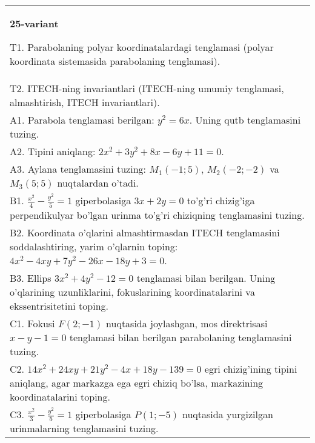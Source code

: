 \documentclass{article}
\begin{document}
\begin{tabular}{m{17cm}}
\textbf{25-variant}
\newline

T1. Parabolaning polyar koordinatalardagi tenglamasi (polyar koordinata sistemasida parabolaning tenglamasi).\\

T2. ITECH-ning invariantlari (ITECH-ning umumiy tenglamasi, almashtirish, ITECH invariantlari).\\

A1. Parabola tenglamasi berilgan: $y^2=6x$. Uning qutb tenglamasini tuzing.\\

A2. Tipini aniqlang: $2x^{2}+3y^{2}+8x-6y+11=0$.\\

A3. Aylana tenglamasini tuzing: $M_1(-1;5)$, $M_2(-2;-2)$ va $M_3(5;5)$ nuqtalardan o'tadi.\\

B1. $\frac{x^{2}}{4} - \frac{y^{2}}{5} = 1$ giperbolasiga $3x + 2y = 0$ to'g'ri chizig'iga perpendikulyar bo'lgan urinma to'g'ri chiziqning tenglamasini tuzing.\\

B2. Koordinata o'qlarini almashtirmasdan ITECH tenglamasini soddalashtiring, yarim o'qlarnin toping: $4x^{2} - 4xy + 7y^{2} - 26x - 18y + 3 = 0$.\\

B3. Ellips $3x^{2} + 4y^{2} - 12 = 0$ tenglamasi bilan berilgan. Uning o'qlarining uzunliklarini, fokuslarining koordinatalarini va ekssentrisitetini toping.  \\

C1. Fokusi $F(2; - 1)$ nuqtasida joylashgan, mos direktrisasi $x - y - 1 = 0$ tenglamasi bilan berilgan parabolaning tenglamasini tuzing.  \\

C2. $14x^{2} + 24xy + 21y^{2} - 4x + 18y - 139 = 0$ egri chizig'ining tipini aniqlang, agar markazga ega egri chiziq bo'lsa, markazining koordinatalarini toping.  \\

C3. $\frac{x^{2}}{3} - \frac{y^{2}}{5} = 1$ giperbolasiga $P(1; - 5)$ nuqtasida yurgizilgan urinmalarning tenglamasini tuzing.\\

\end{tabular}
\vspace{1cm}
\end{document}
